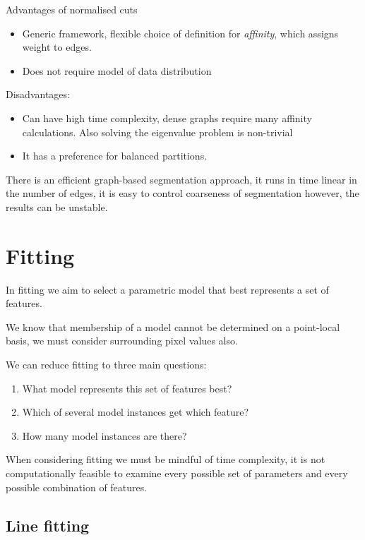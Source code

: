 \documentclass{article}
\begin{document}
Advantages of normalised cuts

\begin{itemize}
  \item Generic framework, flexible choice of definition for \textit{affinity}, which assigns weight to edges.
        \item Does not require model of data distribution
\end{itemize}

Disadvantages:

\begin{itemize}
  \item Can have high time complexity, dense graphs require many affinity calculations. Also solving the eigenvalue problem is non-trivial
        \item It has a preference for balanced partitions.

\end{itemize}

There is an efficient graph-based segmentation approach, it runs in time linear in the number of edges, it is easy to control coarseness of segmentation however, the results can be unstable.

\section{Fitting}

In fitting we aim to select a parametric model that best represents a set of features.

We know that membership of a model cannot be determined on a point-local basis, we must consider surrounding pixel values also.

We can reduce fitting to three main questions:

\begin{enumerate}
  \item What model represents this set of features best?
  \item Which of several model instances get which feature?
  \item How many model instances are there?
\end{enumerate}

When considering fitting we must be mindful of time complexity, it is not computationally feasible to examine every possible set of parameters and every possible combination of features.

\subsection{Line fitting}
\end{document}

